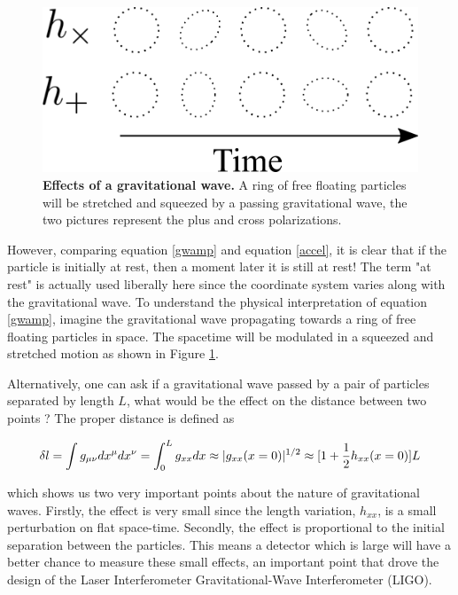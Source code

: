	\begin{figure}[ht]
		\centering
		\includegraphics[width=.4 \textwidth]{../Figures/GW_Particles.png}
		\caption[A ring of free floating particles being stretched and squeezed by a passing gravitational wave.]  
		{\textbf{Effects of a gravitational wave.} A ring of free floating particles will be stretched and squeezed by a passing gravitational wave, the two pictures represent the plus and cross polarizations.}
		\label{fig:gwparticles}
	\end{figure}
	
	However, comparing equation \ref{gwamp} and equation \ref{accel}, it is clear that if the particle is initially at rest, then a moment later it is still at rest! The term "at rest" is actually used liberally here since the coordinate system varies along with the gravitational wave.  To understand the physical interpretation of equation \ref{gwamp}, imagine the gravitational wave propagating towards a ring of free floating particles in space.  The spacetime will be modulated in a squeezed and stretched motion as shown in Figure \ref{fig:gwparticles}.  
	
	Alternatively, one can ask if a gravitational wave passed by a pair of particles separated by length $L$, what would be the effect on the distance between two points \cite{SaulsonStretch}?  The proper distance is defined as

	\begin{equation}\label{propdist}
	\delta l
	= \int{g_{\mu \nu} dx^{\mu} dx^{\nu}} \\
	= \int_{0}^{L}{g_{xx} {d}x}\\
	\approx |g_{xx}(x=0)|^{1/2}\\
	\approx [ 1 + \frac{1}{2} h_{xx}(x=0)] L
	\end{equation} 
	
	which shows us two very important points about the nature of gravitational waves.  Firstly, the effect is very small since the length variation, $h_{xx}$, is a small perturbation on flat space-time.  Secondly, the effect is proportional to the initial separation between the particles. This means a detector which is large will have a better chance to measure these small effects, an important point that drove the design of the Laser Interferometer Gravitational-Wave Interferometer (LIGO).
	
